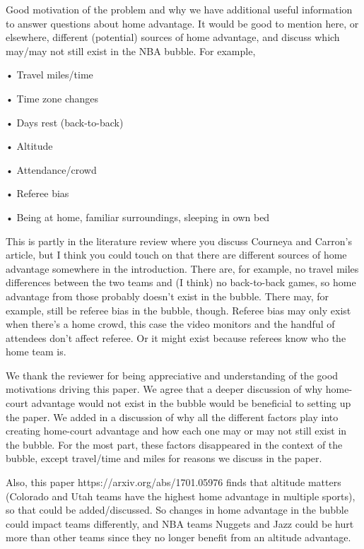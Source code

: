 \documentclass[12pt]{article}
\newenvironment{comment}%
{\begin{quoting}\noindent\small\it\ignorespaces%
  }{\end{quoting}}
\begin{document}
\begin{comment}
Good motivation of the problem and why we have additional useful information to answer questions about
home advantage.
It would be good to mention here, or elsewhere, different (potential) sources of home advantage, and discuss
which may/may not still exist in the NBA bubble. For example,
\item
• Travel miles/time
\item
• Time zone changes
\item
• Days rest (back-to-back)
\item
• Altitude
\item
• Attendance/crowd
\item
• Referee bias
\item
• Being at home, familiar surroundings, sleeping in own bed
\item
This is partly in the literature review where you discuss Courneya and Carron’s article, but I think you could
touch on that there are different sources of home advantage somewhere in the introduction. There are, for
example, no travel miles differences between the two teams and (I think) no back-to-back games, so home
advantage from those probably doesn’t exist in the bubble. There may, for example, still be referee bias in
the bubble, though. Referee bias may only exist when there’s a home crowd, this case the video monitors
and the handful of attendees don’t affect referee. Or it might exist because referees know who the home
team is.
\end{comment}

 We thank the reviewer for being appreciative and understanding of the good motivations driving this paper. We agree that a deeper discussion of why home-court advantage would not exist in the bubble would be beneficial to setting up the paper. We added in a discussion of why all the different factors play into creating home-court advantage and how each one may or may not still exist in the bubble. For the most part, these factors disappeared in the context of the bubble, except travel/time and miles for reasons we discuss in the paper. 

\begin{comment}
Also, this paper https://arxiv.org/abs/1701.05976 finds that altitude matters (Colorado and Utah teams
have the highest home advantage in multiple sports), so that could be added/discussed. So changes in home
advantage in the bubble could impact teams differently, and NBA teams Nuggets and Jazz could be hurt
more than other teams since they no longer benefit from an altitude advantage.
\end{comment}
\end{document}
